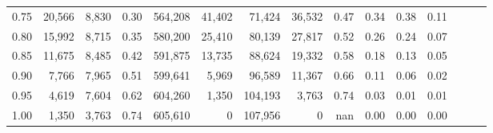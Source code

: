 \begin{tabular}{rrrrrrrrrrrrrrr}
0.75 &  20,566 &  8,830 &  0.30 &  564,208 &   41,402 &   71,424 &   36,532 &  0.47 &  0.34 &  0.38 &      0.11 \\
0.80 &  15,992 &  8,715 &  0.35 &  580,200 &   25,410 &   80,139 &   27,817 &  0.52 &  0.26 &  0.24 &      0.07 \\
0.85 &  11,675 &  8,485 &  0.42 &  591,875 &   13,735 &   88,624 &   19,332 &  0.58 &  0.18 &  0.13 &      0.05 \\
0.90 &   7,766 &  7,965 &  0.51 &  599,641 &    5,969 &   96,589 &   11,367 &  0.66 &  0.11 &  0.06 &      0.02 \\
0.95 &   4,619 &  7,604 &  0.62 &  604,260 &    1,350 &  104,193 &    3,763 &  0.74 &  0.03 &  0.01 &      0.01 \\
1.00 &   1,350 &  3,763 &  0.74 &  605,610 &        0 &  107,956 &        0 &   nan &  0.00 &  0.00 &      0.00 \\
\bottomrule
\end{tabular}
